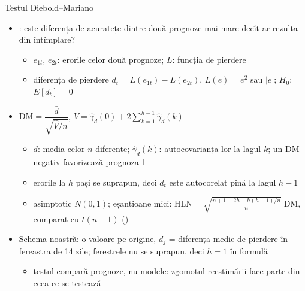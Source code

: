 \begin{frame}{Testul Diebold--Mariano}
\itemsize{\footnotesize}
\begin{itemize}
    \item {}: este diferența de acuratețe dintre două prognoze mai mare decît ar rezulta din întîmplare?
    \begin{itemize}
        \item $e_{1t}$, $e_{2t}$: erorile celor două prognoze; $L$: funcția de pierdere
        \item diferența de pierdere $d_t = L(e_{1t}) - L(e_{2t})$, $L(e) = e^2$ sau $|e|$; $H_0$: $E[d_t] = 0$
    \end{itemize}
    \item $\mathrm{DM} = \dfrac{\bar d}{\sqrt{\hat V/n}}$, $\hat V = \hat\gamma_d(0) + 2\sum_{k=1}^{h-1}\hat\gamma_d(k)$
    \begin{itemize}
        \item $\bar d$: media celor $n$ diferențe; $\hat\gamma_d(k)$: autocovarianța lor la lagul $k$; un DM negativ favorizează prognoza 1
        \item erorile la $h$ pași se suprapun, deci $d_t$ este autocorelat pînă la lagul $h - 1$
        \item asimptotic $N(0, 1)$; eșantioane mici: $\mathrm{HLN} = \sqrt{\frac{n + 1 - 2h + h(h - 1)/n}{n}}\;\mathrm{DM}$, comparat cu $t(n - 1)$ ()
    \end{itemize}
    \item Schema noastră: o valoare pe origine, $d_j$ = diferența medie de pierdere în fereastra de 14 zile; ferestrele nu se suprapun, deci $h = 1$ în formulă
    \begin{itemize}
        \item testul compară prognoze, nu modele: zgomotul reestimării face parte din ceea ce se testează
    \end{itemize}
\end{itemize}
\end{frame}

